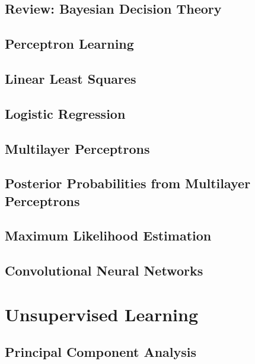 \documentclass{book}
\begin{document}
\chapter{Review: Bayesian Decision Theory}


\chapter{Perceptron Learning}



\chapter{Linear Least Squares}


\chapter{Logistic Regression}


\chapter{Multilayer Perceptrons}



\chapter{Posterior Probabilities from Multilayer Perceptrons}


\chapter{Maximum Likelihood Estimation}



\chapter{Convolutional Neural Networks}




\part{Unsupervised Learning}

\chapter{Principal Component Analysis}


\end{document}
